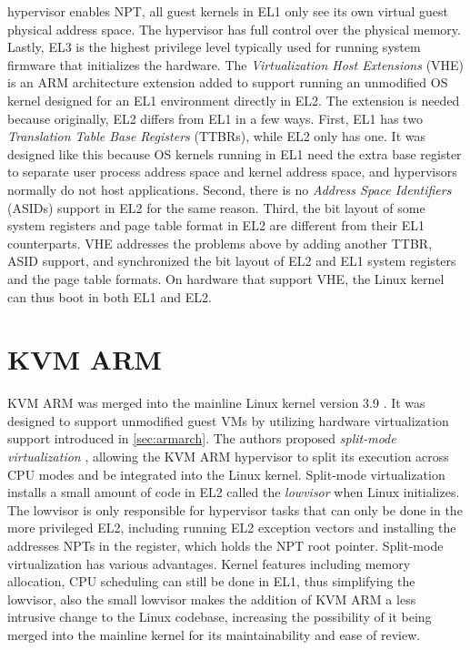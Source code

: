 hypervisor enables NPT, all guest kernels in EL1 only see its own virtual guest
physical address space. The hypervisor has full control over the physical
memory. Lastly, EL3 is the highest privilege level typically used for running
system firmware that initializes the hardware. The
\textit{Virtualization Host Extensions} (VHE) is an ARM architecture extension
added to support running an unmodified OS kernel designed for an EL1
environment directly in EL2. The extension is needed because
originally, EL2 differs from EL1 in a few ways. First, EL1 has two
\textit{Translation Table Base Registers} (TTBRs), while EL2 only has one. It
was designed like this because OS kernels running in EL1 need the extra base
register to separate user process address space and kernel address space, and
hypervisors normally do not host applications. Second, there is no
\textit{Address Space Identifiers} (ASIDs) support in EL2 for the same reason.
Third, the bit layout of some system registers and page table format in EL2 are
different from their EL1 counterparts.
VHE addresses the problems above by adding another TTBR, ASID support, and
synchronized the bit layout of EL2 and EL1 system registers and the page table
formats. On hardware that support VHE, the Linux kernel can thus boot in both
EL1 and EL2.

\section{KVM ARM}

KVM ARM was merged into the mainline Linux kernel version 3.9 \cite{kvmarmlwn}.
It was designed to support unmodified guest VMs by utilizing hardware
virtualization support introduced in \autoref{sec:armarch}. The authors
proposed \textit{split-mode virtualization} \cite{kvmarm}, allowing the KVM ARM
hypervisor to split its execution across CPU modes and be integrated into the
Linux kernel. Split-mode virtualization installs a small amount of code in EL2
called the \textit{lowvisor} when Linux initializes. The lowvisor is only
responsible for hypervisor tasks that can only be done in the more privileged
EL2, including running EL2 exception vectors and installing the addresses NPTs
in the  register, which holds the NPT root pointer. Split-mode
virtualization has various advantages. Kernel features including memory
allocation, CPU scheduling can still be done in EL1, thus simplifying the
lowvisor, also the small lowvisor makes the addition of KVM ARM a less
intrusive change to the Linux codebase, increasing the possibility of it being
merged into the mainline kernel for its maintainability and ease of review.

